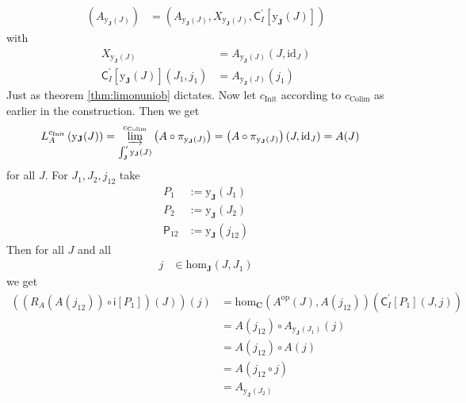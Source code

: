 \begin{cst}
\begin{align*}
  \left(
    A_{\mathrm{y}_{\mathbf{J}}(J)}
  \right)
  &=
  \left(
    A_{\mathrm{y}_{\mathbf{J}}(J)},
    X_{\mathrm{y}_{\mathbf{J}}(J)},
    \mathsf{C}_{I}^{\prime}[\mathrm{y}_{\mathbf{J}}(J)]
  \right)
\end{align*}
with
\begin{align*}
  X_{\mathrm{y}_{\mathbf{J}}(J)}
  &=
  A_{\mathrm{y}_{\mathbf{J}}(J)}
  \left(
    J,
    \mathrm{id}_{J}
  \right)
  \\
  \mathsf{C}_{I}^{\prime}[\mathrm{y}_{\mathbf{J}}(J)]
  (J_{1},j_{1})
  &=
  A_{\mathrm{y}_{\mathbf{J}}(J)}(j_{1})
\end{align*}
Just as theorem \ref{thm:limonuniob} dictates. Now let $c_{\mathrm{Init}}$ according to $c_{\mathrm{Colim}}$ as earlier in the construction. Then we get
\begin{align*}
  L_{A}^{c_{\mathrm{Init}}}
  \left(
    \mathrm{y}_{\mathbf{J}}(J)
  \right)
  &=
  \varinjlim_{\int_{\mathbf{J}}^{\prime}\mathrm{y}_{\mathbf{J}}(J)}^{c_{\mathrm{Colim}}}
  \left(
    A
    \circ
    \pi_{\mathrm{y}_{\mathbf{J}}(J)}
  \right)
  =
  \left(
    A
    \circ
    \pi_{\mathrm{y}_{\mathbf{J}}(J)}
  \right)
  (J,\mathrm{id}_{J})
  =
  A(J)
\end{align*}
for all $J$. For $J_{1},J_{2},j_{12}$ take
\begin{align*}
  P_{1}
  &:=
  \mathrm{y}_{\mathbf{J}}
  \left(
    J_{1}
  \right)
  \\
  P_{2}
  &:=
  \mathrm{y}_{\mathbf{J}}
  \left(
    J_{2}
  \right)
  \\
  \mathsf{P}_{12}
  &:=
  \mathrm{y}_{\mathbf{J}}
  \left(
    j_{12}
  \right)
\end{align*}
Then for all $J$ and all
\begin{align*}
  j
  &\in
  \mathrm{hom}_{\mathbf{J}}(J,J_{1})
\end{align*}
we get
\begin{align*}
  \left(
    \left(
      R_{A}(A(j_{12}))
      \circ
      \mathsf{i}[P_{1}]
    \right)
    (J)
  \right)
  (j)
  &=
  \mathrm{hom}_{\mathbf{C}}
  \left(
    A^{\textrm{op}}(J),
    A(j_{12})
  \right)
  \left(
    \mathsf{C}_{I}^{\prime}[P_{1}](J,j)
  \right)
  \\
  &=
  A(j_{12})
  \circ
  A_{\mathrm{y}_{\mathbf{J}}(J_{1})}(j)
  \\
  &=
  A(j_{12})
  \circ
  A(j)
  \\
  &=
  A
  \left(
    j_{12}
    \circ
    j
  \right)
  \\
  &=
  A_{\mathrm{y}_{\mathbf{J}}(J_{2})}

\end{align*}
\end{cst}
